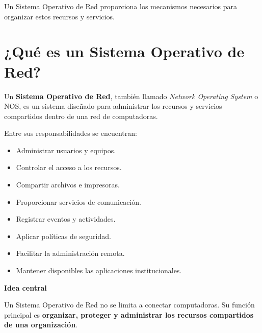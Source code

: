 \documentclass[
  spanish,
  letterpaper,
]{scrbook}
\providecommand{\tightlist}{%
  \setlength{\itemsep}{0pt}\setlength{\parskip}{0pt}}
\begin{document}
Un Sistema Operativo de Red proporciona los mecanismos necesarios para
organizar estos recursos y servicios.

\section{¿Qué es un Sistema Operativo de
Red?}\label{quuxe9-es-un-sistema-operativo-de-red}

Un \textbf{Sistema Operativo de Red}, también llamado \emph{Network
Operating System} o NOS, es un sistema diseñado para administrar los
recursos y servicios compartidos dentro de una red de computadoras.

Entre sus responsabilidades se encuentran:

\begin{itemize}
\tightlist
\item
  Administrar usuarios y equipos.
\item
  Controlar el acceso a los recursos.
\item
  Compartir archivos e impresoras.
\item
  Proporcionar servicios de comunicación.
\item
  Registrar eventos y actividades.
\item
  Aplicar políticas de seguridad.
\item
  Facilitar la administración remota.
\item
  Mantener disponibles las aplicaciones institucionales.
\end{itemize}

\begin{tcolorbox}[enhanced jigsaw, arc=.35mm, bottomrule=.15mm, breakable, colback=white, colframe=quarto-callout-tip-color-frame, left=2mm, leftrule=.75mm, opacityback=0, rightrule=.15mm, toprule=.15mm]
\begin{minipage}[t]{5.5mm}
\textcolor{quarto-callout-tip-color}{\faLightbulb}
\end{minipage}%
\begin{minipage}[t]{\textwidth - 5.5mm}

\vspace{-3mm}\textbf{Idea central}\vspace{3mm}

Un Sistema Operativo de Red no se limita a conectar computadoras. Su
función principal es \textbf{organizar, proteger y administrar los
recursos compartidos de una organización}.

\end{minipage}%
\end{tcolorbox}
\end{document}
